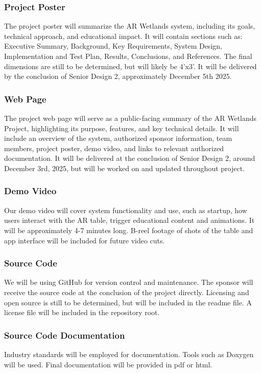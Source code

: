 \subsubsection{Project Poster}
The project poster will summarize the AR Wetlands system, including its goals, technical approach, and educational impact. It will contain sections such as: Executive Summary, Background, Key Requirements, System Design, Implementation and Test Plan, Results, Conclusions, and References. The final dimensions are still to be determined, but will likely be 4'x3'. It will be delivered by the conclusion of Senior Design 2, approximately December 5th 2025.

\subsubsection{Web Page}
The project web page will serve as a public-facing summary of the AR Wetlands Project, highlighting its purpose, features, and key technical details. It will include an overview of the system, authorized sponsor information, team members, project poster, demo video, and links to relevant authorized documentation. It will be delivered at the conclusion of Senior Design 2, around December 3rd, 2025, but will be worked on and updated throughout project.

\subsubsection{Demo Video}
Our demo video will cover system functionality and use, such as startup, how users interact with the AR table, trigger educational content and animations. It will be approximately 4-7 minutes long. B-reel footage of shots of the table and app interface will be included for future video cuts.

\subsubsection{Source Code}
We will be using GitHub for version control and maintenance. The sponsor will receive the source code at the conclusion of the project directly. Licensing and open source is still to be determined, but will be included in the readme file. A license file will be included in the repository root.

\subsubsection{Source Code Documentation}
Industry standards will be employed for documentation. Tools such as Doxygen will be used. Final documentation will be provided in pdf or html.

